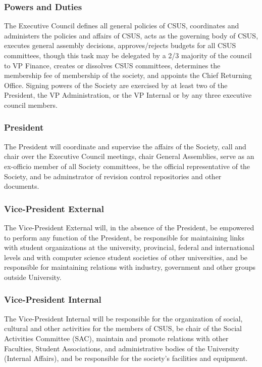 \subsubsection{Powers and Duties}\label{powers-and-duties}

The Executive Council defines all general policies of CSUS, coordinates
and administers the policies and affairs of CSUS, acts as the governing
body of CSUS, executes general assembly decisions, approves/rejects
budgets for all CSUS committees, though this task may be delegated by a
2/3 majority of the council to VP Finance, creates or dissolves CSUS
committees, determines the membership fee of membership of the society,
and appoints the Chief Returning Office. Signing powers of the Society
are exercised by at least two of the President, the VP Administration,
or the VP Internal or by any three executive council members.

\subsubsection{President}\label{president}

The President will coordinate and supervise the affairs of the Society,
call and chair over the Executive Council meetings, chair General
Assemblies, serve as an ex-officio member of all Society committees, be
the official representative of the Society, and be adminstrator of
revision control repositories and other documents.

\subsubsection{Vice-President External}\label{vice-president-external}

The Vice-President External will, in the absence of the President, be
empowered to perform any function of the President, be responsible for
maintaining links with student organizations at the university,
provincial, federal and international levels and with computer science
student societies of other universities, and be responsible for
maintaining relations with industry, government and other groups outside
University.

\subsubsection{Vice-President Internal}\label{vice-president-internal}

The Vice-President Internal will be responsible for the organization of
social, cultural and other activities for the members of CSUS, be chair
of the Social Activities Committee (SAC), maintain and promote relations
with other Faculties, Student Associations, and administrative bodies of
the University (Internal Affairs), and be responsible for the society's
facilities and equipment.

